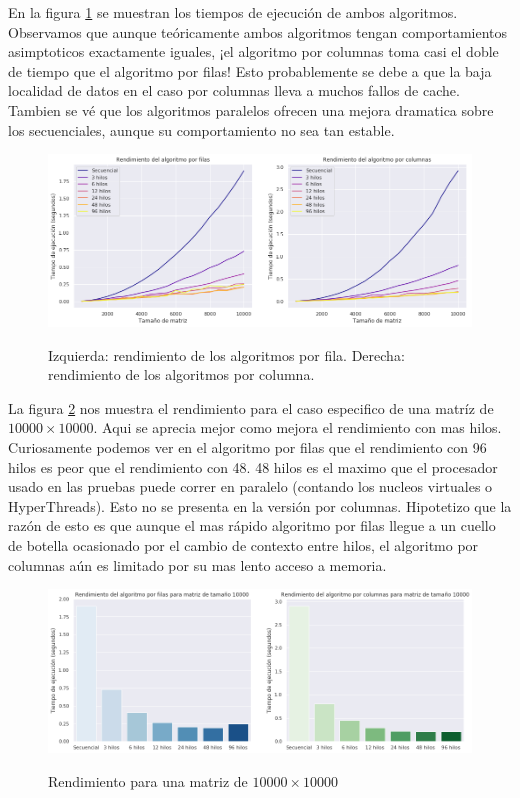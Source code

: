 \documentclass{report}
\begin{document}
En la figura \ref{fig:starperf} se muestran los tiempos de ejecución de ambos
algoritmos. Observamos que aunque teóricamente ambos algoritmos tengan
comportamientos asimptoticos exactamente iguales, ¡el algoritmo por columnas toma
casi el doble de tiempo que el algoritmo por filas! Esto probablemente se debe a
que la baja localidad de datos en el caso por columnas lleva a muchos fallos de
cache. Tambien se vé que los algoritmos paralelos ofrecen una mejora dramatica
sobre los secuenciales, aunque su comportamiento no sea tan estable.

\begin{figure}[h]
  \caption{Izquierda: rendimiento de los algoritmos por fila. Derecha: rendimiento
           de los algoritmos por columna.}
\includegraphics[width=\textwidth]{stars_perf}
\label{fig:starperf}
\end{figure}

La figura \ref{fig:starperfbar} nos muestra el rendimiento para el caso especifico
de una matríz de $10000 \times 10000$. Aqui se aprecia mejor como mejora el rendimiento con
mas hilos. Curiosamente podemos ver en el algoritmo por filas que el rendimiento
con 96 hilos es peor que el rendimiento con 48. 48 hilos es el maximo que el
procesador usado en las pruebas puede correr en paralelo (contando los nucleos
virtuales o HyperThreads). Esto no se presenta en la versión por columnas.
Hipotetizo que la razón de esto es que aunque el mas rápido algoritmo por filas
llegue a un cuello de botella ocasionado por el cambio de contexto entre hilos,
el algoritmo por columnas aún es limitado por su mas lento acceso a memoria.

\begin{figure}[H]
  \caption{Rendimiento para una matriz de $10000 \times 10000$}
\includegraphics[width=\textwidth]{stars_1000_perf}
\label{fig:starperfbar}
\end{figure}
\end{document}
